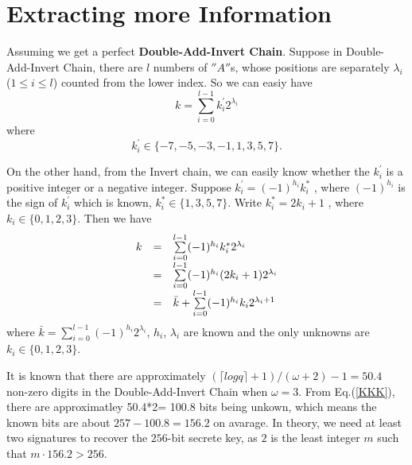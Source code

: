 \documentclass[sigconf]{acmart}
\begin{document}
\section{ Extracting more Information }
      Assuming we get a perfect {\bf Double-Add-Invert Chain}. Suppose in  Double-Add-Invert Chain, there are $l$ numbers of $''A''$s, whose positions are separately $\lambda_i$($1\leq i\leq l$) counted from the lower index. So we can easiy have
 $$k=\sum\limits_{i=0}^{l-1}  k^{'}_i 2^{\lambda_i}$$
 where $$k^{'}_i\in\{-7,-5,-3,-1,1,3,5,7\}.$$

    On the other hand, from the Invert chain, we can easily know whether the $k^{'}_i$ is a positive integer or a negative integer. Suppose  $k^{'}_i=(-1)^{h_i} k^{*}_i$ , where $(-1)^{h_i}$ is the sign of $k^{'}_i$  which is known, $k^{*}_i\in \{1,3,5,7\}$. Write $ k^{*}_i=2k_i+1$ , where $k_i\in \{0,1,2,3\}$. Then we have
 \begin{equation}
  \begin{array}{lll}{\label {KKK}}
 k&=&\sum\limits_{i=0}^{l-1} (-1)^{h_i} k^{*}_i 2^{\lambda_i}  \\
 &=& \sum\limits_{i=0}^{l-1} (-1)^{h_i}(2k_i+1)2^{\lambda_i}  \\
 &=&\bar{k}+\sum\limits_{i=0}^{l-1} (-1)^{h_i}k_i2^{\lambda_i+1}
  \end{array}
 \end{equation}
where $\bar{k}=\sum\limits_{i=0}^{l-1}{(-1)^{h_i}2^{\lambda_i} }$, $h_i$, $\lambda_i$ are known and the only unknowns are $k_i\in\{0,1,2,3\}$.


    It is known that there are approximately $(\lceil logq\rceil +1)/(\omega+2)-1=50.4 $ non-zero digits in the Double-Add-Invert Chain when  $\omega=3$. From Eq.(\ref{KKK}), there
    are approximatley 50.4*2= 100.8 bits being unkown, which means the known bits are about $257-100.8=156.2$ on avarage. In theory, we need at least two signatures to recover the $256$-bit secrete key, as $2$ is the least integer $m$ such that $m\cdot 156.2 >256$.
\end{document}
